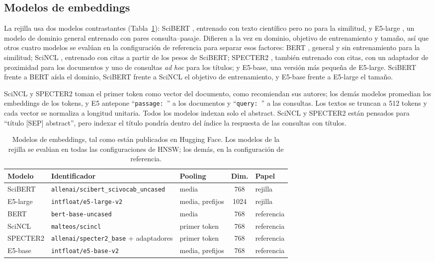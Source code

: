 \documentclass[runningheads]{llncs}
\begin{document}
\subsection{Modelos de embeddings}

La rejilla usa dos modelos contrastantes (Tabla~\ref{tab:modelspec}): SciBERT \cite{ref18},
entrenado con texto científico pero no para la similitud, y E5-large \cite{ref19}, un modelo
de dominio general entrenado con pares consulta--pasaje. Difieren a la vez en dominio,
objetivo de entrenamiento y tamaño, así que otros cuatro modelos se evalúan en la
configuración de referencia para separar esos factores: BERT \cite{devlin2019}, general y sin
entrenamiento para la similitud; SciNCL \cite{ostendorff2022}, entrenado con citas a partir
de los pesos de SciBERT; SPECTER2 \cite{singh2023}, también entrenado con citas, con un
adaptador de proximidad para los documentos y uno de consultas \textit{ad hoc} para los
títulos; y E5-base, una versión más pequeña de E5-large. SciBERT frente a BERT aísla el
dominio, SciBERT frente a SciNCL el objetivo de entrenamiento, y E5-base frente a E5-large el
tamaño.

SciNCL y SPECTER2 toman el primer token como vector del documento, como recomiendan sus
autores; los demás modelos promedian los embeddings de los tokens, y E5 antepone
``\texttt{passage: }'' a los documentos y ``\texttt{query: }'' a las consultas. Los textos se
truncan a 512 tokens y cada vector se normaliza a longitud unitaria. Todos los modelos indexan
solo el abstract. SciNCL y SPECTER2 están pensados para ``título [SEP] abstract'', pero
indexar el título pondría dentro del índice la respuesta de las consultas con títulos.

\begin{table}[tbp]
\caption{Modelos de embeddings, tal como están publicados en Hugging Face. Los modelos de la
rejilla se evalúan en todas las configuraciones de HNSW; los demás, en la configuración de
referencia.}\label{tab:modelspec}
\centering
\small
\begin{tabular}{|l|l|l|c|l|}
\hline
\textbf{Modelo} & \textbf{Identificador} & \textbf{Pooling} & \textbf{Dim.} & \textbf{Papel} \\
\hline
SciBERT & \texttt{allenai/scibert\_scivocab\_uncased} & media & 768 & rejilla \\
E5-large & \texttt{intfloat/e5-large-v2} & media, prefijos & 1024 & rejilla \\
BERT & \texttt{bert-base-uncased} & media & 768 & referencia \\
SciNCL & \texttt{malteos/scincl} & primer token & 768 & referencia \\
SPECTER2 & \texttt{allenai/specter2\_base} + adaptadores & primer token & 768 & referencia \\
E5-base & \texttt{intfloat/e5-base-v2} & media, prefijos & 768 & referencia \\
\hline
\end{tabular}
\end{table}
\end{document}
